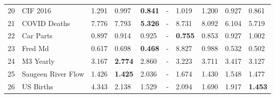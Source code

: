 \begin{tabular}{llllllllll}
20 & CIF 2016 & 1.291 & 0.997 & \textbf{0.841} & - & 1.019 & 1.200 & 0.927 & 0.861 \\
21 & COVID Deaths & 7.776 & 7.793 & \textbf{5.326} & - & 8.731 & 8.092 & 6.104 & 5.719 \\
22 & Car Parts & 0.897 & 0.914 & 0.925 & - & \textbf{0.755} & 0.853 & 0.927 & 1.002 \\
23 & Fred Md & 0.617 & 0.698 & \textbf{0.468} & - & 8.827 & 0.988 & 0.532 & 0.502 \\
24 & M3 Yearly & 3.167 & \textbf{2.774} & 2.860 & - & 3.223 & 3.711 & 3.417 & 3.127 \\
25 & Saugeen River Flow & 1.426 & \textbf{1.425} & 2.036 & - & 1.674 & 1.430 & 1.548 & 1.477 \\
26 & US Births & 4.343 & 2.138 & 1.529 & - & 2.094 & 1.690 & 1.917 & \textbf{1.453} \\
\bottomrule
\end{tabular}
